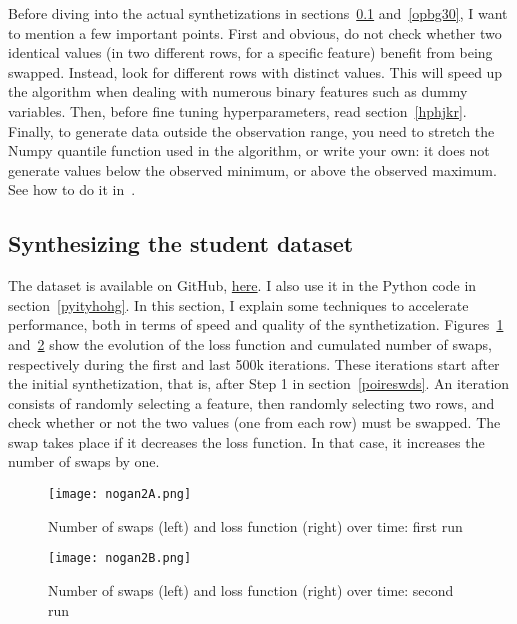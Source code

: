 \documentclass[oneside,10pt]{book}
\begin{document}
Before diving into the actual synthetizations in sections~\ref{opewsd} and~\ref{opbg30}, I want to mention a few important points.
 First and obvious, do not check whether two identical values (in two different rows, for a specific feature) benefit from being swapped. Instead, look for different rows with distinct values. This will speed up the algorithm when dealing with numerous binary features such as dummy variables. Then,
 before fine tuning hyperparameters, read section~\ref{hphjkr}. Finally, to generate data outside the observation range, you need to stretch the Numpy
\textcolor{index}{quantile function} used in the algorithm, or write your own: it does not generate values below the observed minimum, or above the observed maximum. 
 See how to do it in~\cite{pcper43w}.

\subsection{Synthesizing the student dataset}\label{opewsd}

The dataset is available on GitHub, \href{https://github.com/VincentGranville/Main/blob/main/students.csv}{here}. I also use it in the Python code in section~\ref{pyityhohg}. In this section, I explain some techniques to accelerate performance, both in terms of speed and quality of the synthetization.
Figures~\ref{fig:nogan2ab} and~\ref{fig:nogan2abc} show the evolution of the loss function and cumulated number of swaps, respectively during the first and last 500k iterations.
 These iterations start after the initial synthetization, that is, after Step 1 in section~\ref{poireswds}.
An iteration consists of randomly selecting a feature, then randomly selecting two rows, and check whether or not the two values (one from each row) must be swapped. The swap takes place if it decreases the loss function. In that case, it increases the number of swaps by one.




\begin{figure}[H]
\centering
\texttt{[image: nogan2A.png]} %
\caption{Number of swaps (left) and loss function (right) over time: first run}
\label{fig:nogan2ab}
\end{figure}


\begin{figure}[H]
\centering
\texttt{[image: nogan2B.png]} %
\caption{Number of swaps (left) and loss function (right) over time: second run}
\label{fig:nogan2abc}
\end{figure}
\end{document}

